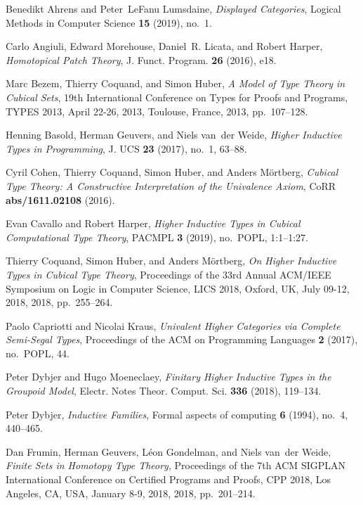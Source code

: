 \documentclass[9pt]{entcs}
\newcommand{\0}{\textbf{0}} %
\newcommand{\1}{\textbf{1}} %
\begin{document}
\begin{thebibliography}{10}
	Benedikt Ahrens and Peter~LeFanu Lumsdaine, \emph{{Displayed Categories}},
	Logical Methods in Computer Science \textbf{15} (2019), no.~1.
	
	Carlo Angiuli, Edward Morehouse, Daniel~R. Licata, and Robert Harper,
	\emph{{Homotopical Patch Theory}}, J. Funct. Program. \textbf{26} (2016),
	e18.
	
	Marc Bezem, Thierry Coquand, and Simon Huber, \emph{{A Model of Type Theory in
			Cubical Sets}}, 19th International Conference on Types for Proofs and
	Programs, {TYPES} 2013, April 22-26, 2013, Toulouse, France, 2013,
	pp.~107--128.
	
	Henning Basold, Herman Geuvers, and Niels van~der Weide, \emph{{Higher
			Inductive Types in Programming}}, J. {UCS} \textbf{23} (2017), no.~1, 63--88.
	
	Cyril Cohen, Thierry Coquand, Simon Huber, and Anders M{\"{o}}rtberg,
	\emph{{Cubical Type Theory: A Constructive Interpretation of the Univalence
			Axiom}}, CoRR \textbf{abs/1611.02108} (2016).
	
	Evan Cavallo and Robert Harper, \emph{{Higher Inductive Types in Cubical
			Computational Type Theory}}, {PACMPL} \textbf{3} (2019), no.~{POPL},
	1:1--1:27.
	
	Thierry Coquand, Simon Huber, and Anders M{\"{o}}rtberg, \emph{{On Higher
			Inductive Types in Cubical Type Theory}}, Proceedings of the 33rd Annual
	{ACM/IEEE} Symposium on Logic in Computer Science, {LICS} 2018, Oxford, UK,
	July 09-12, 2018, 2018, pp.~255--264.
	
	Paolo Capriotti and Nicolai Kraus, \emph{{Univalent Higher Categories via
			Complete Semi-Segal Types}}, Proceedings of the ACM on Programming Languages
	\textbf{2} (2017), no.~POPL, 44.
	
	Peter Dybjer and Hugo Moeneclaey, \emph{{Finitary Higher Inductive Types in the
			Groupoid Model}}, Electr. Notes Theor. Comput. Sci. \textbf{336} (2018),
	119--134.
	
	Peter Dybjer, \emph{{Inductive Families}}, Formal aspects of computing
	\textbf{6} (1994), no.~4, 440--465.
	
	Dan Frumin, Herman Geuvers, L{\'{e}}on Gondelman, and Niels van~der Weide,
	\emph{{Finite Sets in Homotopy Type Theory}}, Proceedings of the 7th {ACM}
	{SIGPLAN} International Conference on Certified Programs and Proofs, {CPP}
	2018, Los Angeles, CA, USA, January 8-9, 2018, 2018, pp.~201--214.
	

\end{thebibliography}
\end{document}
